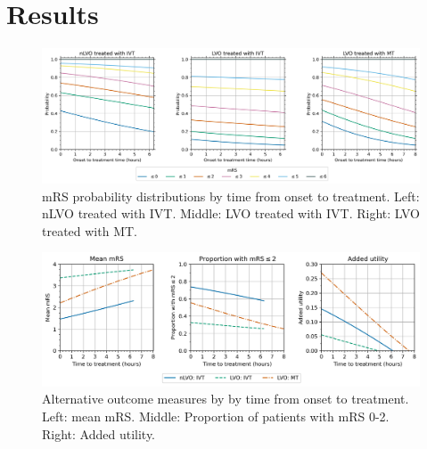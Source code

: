 \section{Results}

\begin{figure}
\centering
\includegraphics[width=\textwidth]{./images/probs_with_time}
\caption{mRS probability distributions by time from onset to treatment. Left: nLVO treated with IVT. Middle: LVO treated with IVT. Right: LVO treated with MT.}
\label{fig:probs_with_time_1}
\end{figure}

\begin{figure}
\centering
\includegraphics[width=\textwidth]{./images/time_to_treatment}
\caption{Alternative outcome measures by by time from onset to treatment. Left: mean mRS. Middle: Proportion of patients with mRS 0-2. Right: Added utility.}
\label{fig:probs_with_time_2}
\end{figure}


